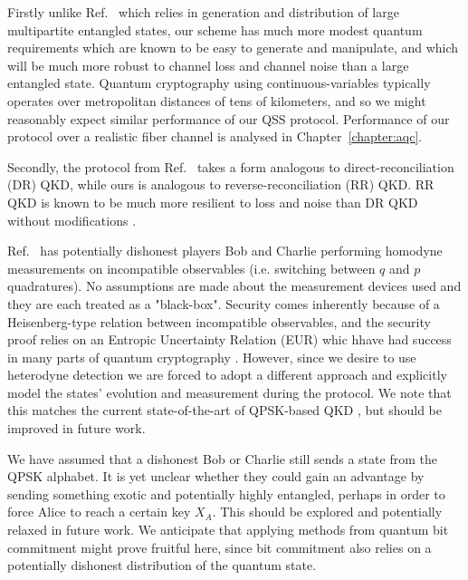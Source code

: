 Firstly unlike Ref.~\cite{Kogias2017} which relies in generation and distribution of large multipartite entangled states, our scheme has much more modest quantum requirements which are known to be easy to generate and manipulate, and which will be much more robust to channel loss and channel noise than a large entangled state. Quantum cryptography using continuous-variables typically operates over metropolitan distances of tens of kilometers, and so we might reasonably expect similar performance of our QSS protocol. Performance of our protocol over a realistic fiber channel is analysed in Chapter~\ref{chapter:aqc}. 

Secondly, the protocol from Ref.~\cite{Kogias2017} takes a form analogous to direct-reconciliation (DR) QKD, while ours is analogous to reverse-reconciliation (RR) QKD. RR QKD is known \cite{Grosshans2002, Grosshans2003, Laudenbach2017} to be much more resilient to loss and noise than DR QKD without modifications \cite{Silberhorn2002}.

Ref.~\cite{Kogias2017} has potentially dishonest players Bob and Charlie performing homodyne measurements on incompatible observables (i.e. switching between $q$ and $p$ quadratures). No assumptions are made about the measurement devices used and they are each treated as a "black-box". Security comes inherently because of a Heisenberg-type relation between incompatible observables, and the security proof relies on an Entropic Uncertainty Relation (EUR) whic hhave had success in many parts of quantum cryptography \cite{Furrer2012, Furrer2017}. However, since we desire to use heterodyne detection we are forced to adopt a different approach and explicitly model the states' evolution and measurement during the protocol. We note that this matches the current state-of-the-art of QPSK-based QKD \cite{Papanastasiou2018}, but should be improved in future work.

We have assumed that a dishonest Bob or Charlie still sends a state from the QPSK alphabet. It is yet unclear whether they could gain an advantage by sending something exotic and potentially highly entangled, perhaps in order to force Alice to reach a certain key $X_A$. This should be explored and potentially relaxed in future work. We anticipate that applying methods from quantum bit commitment \cite{Broadbent2015} might prove fruitful here, since bit commitment also relies on a potentially dishonest distribution of the quantum state.

